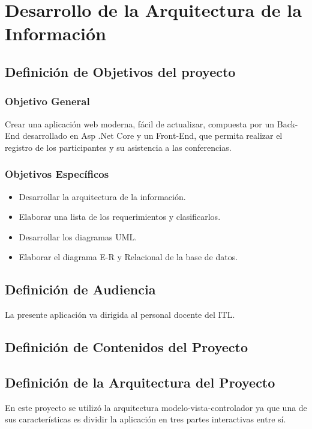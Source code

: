 \chapter{Desarrollo de la Arquitectura de la Información}

\section{Definición de Objetivos del proyecto}
\subsection{Objetivo General}

Crear una aplicación web moderna, fácil de actualizar, compuesta por un Back-End desarrollado en Asp .Net Core y un Front-End, que permita realizar el registro de los participantes y su asistencia a las conferencias.

\subsection{Objetivos Específicos}
 
\begin{itemize}
	\item Desarrollar la arquitectura de la información.
	\item Elaborar una lista de los requerimientos y clasificarlos.
	\item Desarrollar los diagramas UML.
	\item Elaborar el diagrama E-R y Relacional de la base de datos.
\end{itemize}

\section{Definición de Audiencia}
La presente aplicación va dirigida al personal docente del ITL.

\section{Definición de Contenidos del Proyecto}


\section{Definición de la Arquitectura del Proyecto}

En este proyecto se utilizó la arquitectura modelo-vista-controlador ya que una de sus características es dividir la aplicación en tres partes interactivas entre sí.

